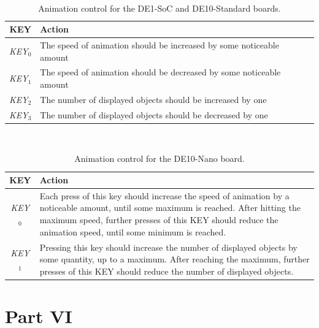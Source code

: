 \documentclass[epsfig,10pt,fullpage]{article}
\begin{document}
\begin{table}[h]
\caption{Animation control for the DE1-SoC and DE10-Standard boards.}
~\\
\centering
\label{tab:action1}
\begin{tabular}{c|p{10cm}}
{\bf KEY} & {\bf Action} \\ \hline
\rule{0cm}{12pt}{\it KEY}$_0$ & The speed of animation should be increased by some noticeable amount \\
{\it KEY}$_1$ & The speed of animation should be decreased by some noticeable amount \\
{\it KEY}$_2$ & The number of displayed objects should be increased by one \\
{\it KEY}$_3$ & The number of displayed objects should be decreased by one \\
\end{tabular}
\end{table}

\begin{table}[h]
\caption{Animation control for the DE10-Nano board.}
~\\
\centering
\label{tab:action2}
\begin{tabular}{c|p{13cm}}
{\bf KEY} & {\bf Action} \\ \hline
\rule{0cm}{12pt}{\it KEY}$_0$ & Each press of this key should increase the speed of animation by a noticeable amount, until some maximum is reached. After hitting the maximum speed, further presses of this KEY should reduce the animation speed, until some minimum is reached.\\
{\it KEY}$_1$ & Pressing this key should increase the number of displayed objects by some quantity, up to a maximum. After reaching the maximum, further presses of this KEY should reduce the number of displayed objects.\\
\end{tabular}
\end{table}

\section*{Part VI}
\end{document}
